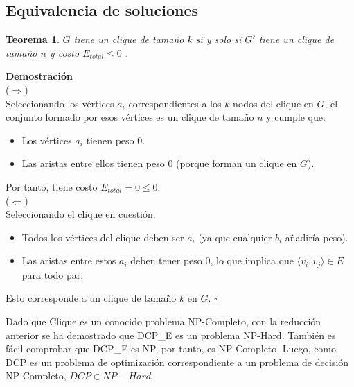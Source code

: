 \documentclass[letterpaper, 12pt]{report}
\newtheorem*{theorem*}{Teorema}
\begin{document}

\subsection{Equivalencia de soluciones}

\begin{theorem*}
    $G$ tiene un clique de tamaño $k$ si y solo si $G'$ tiene un clique de tamaño $n$ y costo $E_{total} \leq 0$ .
\end{theorem*}

\noindent
\textbf{Demostración} \\


($\Rightarrow$) \\


Seleccionando los vértices $ a_i $ correspondientes a los $ k $ nodos del clique en $ G $, el conjunto formado por esos v\'ertices es un clique de tamaño $n$ y cumple que:  

\begin{itemize}
    \item Los vértices $ a_i $ tienen peso 0.  
    \item Las aristas entre ellos tienen peso 0 (porque forman un clique en $ G $).  
\end{itemize}

Por tanto, tiene costo $E_{total} = 0 \leq 0$. \\

($\Leftarrow$) \\ 
Seleccionando el clique en cuesti\'on:
\begin{itemize}
    \item Todos los vértices del clique deben ser $ a_i $ (ya que cualquier $ b_i $ añadiría peso).
    \item Las aristas entre estos $ a_i $ deben tener peso 0, lo que implica que $ \langle v_i, v_j \rangle \in E $ para todo par.      
\end{itemize}

Esto corresponde a un clique de tamaño $ k $ en $ G $.  $\square$

Dado que Clique es un conocido problema NP-Completo, con la reducción anterior se ha demostrado que DCP\_E es un problema
NP-Hard. También es f\'acil comprobar que DCP\_E es NP, por tanto, es NP-Completo. Luego, como DCP es un problema
de optimización correspondiente a un problema de decisi\'on NP-Completo, $DCP \in NP-Hard$




\end{document}
